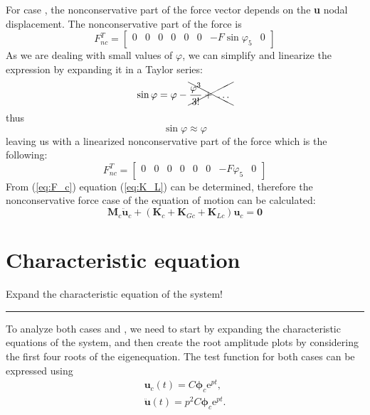\documentclass[12pt]{article}
\newcommand*\circled[1]{%
  \tikz[baseline=(char.base)]{%
    \node[shape=circle,draw,inner sep=1pt] (char) {#1};%
  }%
}
\newcommand{\horrule}[1]{\rule{\linewidth}{#1}}
\begin{document}
For case \circled{b.}, the nonconservative part of the force vector depends on the \textbf{u} nodal displacement. The nonconservative part of the force is
\begin{equation}
F_{nc}^T = \begin{bmatrix}
0 &0 &0 &0 &0 &0 & -F \sin\varphi_5 & 0
\end{bmatrix}
\end{equation}
As we are dealing with small values of $\varphi$, we can simplify and linearize the expression by expanding it in a Taylor series:
\begin{equation*}
\sin{\varphi} = \varphi - \xcancel{\frac{\varphi^3}{3!} + ~ \dots~}
\end{equation*}
thus 
\begin{equation*}
\sin \varphi \approx \varphi
\end{equation*}
leaving us with a linearized nonconservative part of the force which is the following:
\begin{equation}
\label{eq:F_c}
F_{nc}^T = \begin{bmatrix}
0 &0 &0 &0 &0 &0 & -F \varphi_5 & 0
\end{bmatrix}
\end{equation}
From (\ref{eq:F_c}) equation (\ref{eq:K_L}) can be determined, therefore the nonconservative force case of the equation of motion can be calculated:
\begin{equation}
\textbf{M}_c \ddot{\textbf{u}}_c + \left( \textbf{K}_c + \textbf{K}_{Gc} + \textbf{K}_{Lc}  \right) \textbf{u}_c = \textbf{0}
\end{equation}
\newpage

\section{Characteristic equation}
Expand the characteristic equation of the system!\\
\horrule{0.4pt}
\medskip
To analyze both cases \circled{a.} and \circled{b.}, we need to start by expanding the characteristic equations of the system, and then create the root amplitude plots by considering the first four roots of the eigenequation. The test function for both cases can be expressed using 
\begin{gather}
\textbf{u}_c (t) = C \boldsymbol{\phi}_c \text{e} ^{pt}, \\
\ddot{\textbf{u}} (t) = p^2 C \boldsymbol{\phi}_c \text{e} ^{pt} .
\end{gather}
\end{document}
